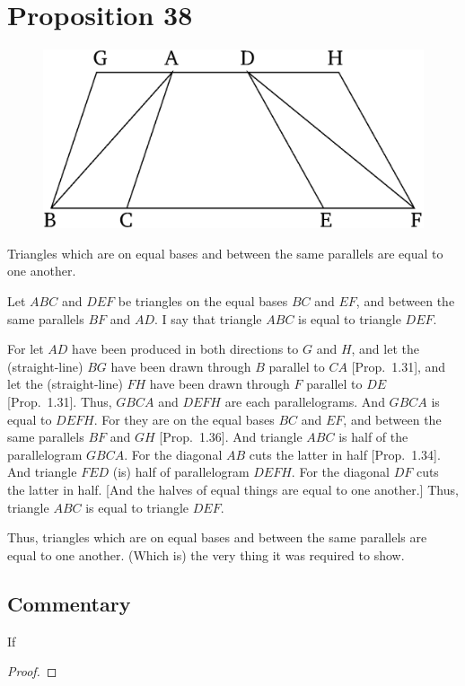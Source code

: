 \chapter*{Proposition 38}



\begin{figure}[ht]
    \begin{center}
    \includegraphics[width=0.5\linewidth]{figures/fig38e.eps}
    \label{fig:prop_38}
    \end{center}
\end{figure}

Triangles which are on equal bases and between the same parallels
are equal to one another.

Let $ABC$ and $DEF$ be triangles on the equal bases $BC$ and $EF$, and between the same parallels $BF$ and $AD$. I say that triangle $ABC$ is equal to triangle $DEF$.

For let $AD$ have been produced in both directions to $G$ and $H$, and
let the (straight-line) $BG$ have been drawn through $B$ parallel to $CA$ [Prop.~1.31], and let the (straight-line) $FH$ have been drawn through
$F$ parallel to $DE$ [Prop.~1.31]. Thus,  $GBCA$ and $DEFH$ are
each parallelograms. And $GBCA$ is equal to $DEFH$.
For they are on the equal bases $BC$ and $EF$, and between  the same
parallels $BF$ and $GH$ [Prop.~1.36]. And triangle $ABC$ is half of the parallelogram
$GBCA$. For the diagonal $AB$ cuts the latter in half [Prop.~1.34]. And
triangle $FED$ (is) half of parallelogram $DEFH$. For the diagonal $DF$ cuts
the latter in half. [And the halves of equal things are equal to one another.] Thus,
triangle $ABC$ is equal to triangle $DEF$.

Thus, triangles which are on equal bases and between the same parallels
are equal to one another. (Which is) the very thing it was required to show.



\section*{Commentary}

\begin{proposition}\label{proposition_38}\leanok
    If
\end{proposition}
\begin{proof}
    \leanok
\end{proof}

